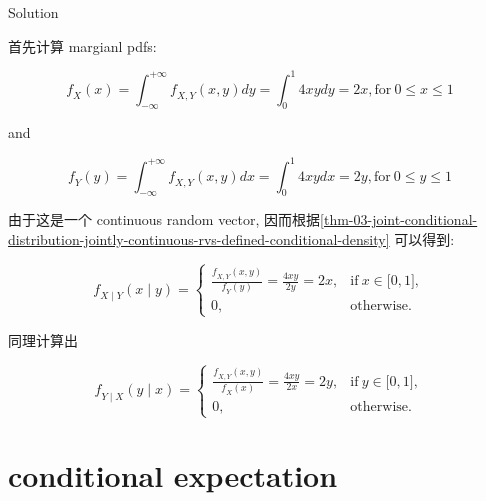 \begin{qlsolution}{Solution}

首先计算 margianl pdfs:

\[\mathit{f}_{\mathit{X}}(\mathit{x}) = \int_{- \infty}^{+ \infty}\mathit{f}_{\mathit{X},\mathit{Y}}(\mathit{x},\mathit{y})\mathit{d}\mathit{y} = \int_{0}^{1}4\mathit{x}\mathit{y}\mathit{d}\mathit{y} = 2\mathit{x},\text{for}\ 0 \leq \mathit{x} \leq 1\]

and

\[\mathit{f}_{\mathit{Y}}(\mathit{y}) = \int_{- \infty}^{+ \infty}\mathit{f}_{\mathit{X},\mathit{Y}}(\mathit{x},\mathit{y})\mathit{d}\mathit{x} = \int_{0}^{1}4\mathit{x}\mathit{y}\mathit{d}\mathit{x} = 2\mathit{y},\text{for}\ 0 \leq \mathit{y} \leq 1\]

由于这是一个 continuous random vector, 因而根据\ref{thm-03-joint-conditional-distribution-jointly-continuous-rvs-defined-conditional-density} 可以得到:

\[\mathit{f}_{\mathit{X} \mid \mathit{Y}}(\mathit{x} \mid \mathit{y}) = \left\{ \begin{matrix}
{\frac{\mathit{f}_{\mathit{X},\mathit{Y}}(\mathit{x},\mathit{y})}{\mathit{f}_{\mathit{Y}}(\mathit{y})} = \frac{4\mathit{x}\mathit{y}}{2\mathit{y}} = 2\mathit{x},} & {\text{if}\ \mathit{x} \in \lbrack 0,1\rbrack,} \\
{0,} & \text{otherwise.}
\end{matrix} \right.\]

同理计算出

\[\mathit{f}_{\mathit{Y} \mid \mathit{X}}(\mathit{y} \mid \mathit{x}) = \left\{ \begin{matrix}
{\frac{\mathit{f}_{\mathit{X},\mathit{Y}}(\mathit{x},\mathit{y})}{\mathit{f}_{\mathit{X}}(\mathit{x})} = \frac{4\mathit{x}\mathit{y}}{2\mathit{x}} = 2\mathit{y},} & {\text{if}\ \mathit{y} \in \lbrack 0,1\rbrack,} \\
{0,} & \text{otherwise.}
\end{matrix} \right.\]

\end{qlsolution}

\section{conditional expectation}\label{conditional-expectation}


